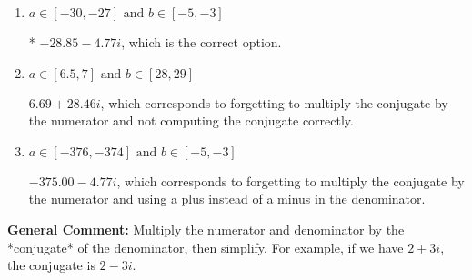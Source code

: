 \documentclass{extbook}[14pt]
\begin{document}
\begin{enumerate}
{\begin{enumerate}[label=\Alph*.]
 $-28.85  - 62.00 i$, which corresponds to forgetting to multiply the conjugate by the numerator.
\item \( a \in [-30, -27] \text{ and } b \in [-5, -3] \)

* $-28.85  - 4.77 i$, which is the correct option.
\item \( a \in [6.5, 7] \text{ and } b \in [28, 29] \)

 $6.69  + 28.46 i$, which corresponds to forgetting to multiply the conjugate by the numerator and not computing the conjugate correctly.
\item \( a \in [-376, -374] \text{ and } b \in [-5, -3] \)

 $-375.00  - 4.77 i$, which corresponds to forgetting to multiply the conjugate by the numerator and using a plus instead of a minus in the denominator.
\end{enumerate}

\textbf{General Comment:} Multiply the numerator and denominator by the *conjugate* of the denominator, then simplify. For example, if we have $2+3i$, the conjugate is $2-3i$.
}
\end{enumerate}
\end{document}

